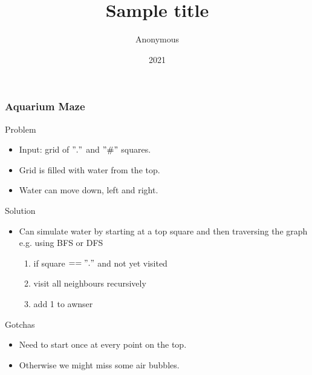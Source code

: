 \documentclass{beamer}
\title{Sample title}
\author{Anonymous}
\institute{Overleaf}
\date{2021}
\begin{document}
\frame{\titlepage}

\begin{frame}
    \frametitle{Aquarium Maze}
    \begin{block}{Problem}
        \begin{itemize}
            \item Input: grid of $"."$ and $"\#"$ squares.
            \item Grid is filled with water from the top.
            \item Water can move down, left and right.
        \end{itemize}
    \end{block}
    \begin{block}{Solution}
        \begin{itemize}
            \item Can simulate water by starting at a top square and then traversing the graph e.g. using BFS or DFS
            \begin{enumerate}
                \item if square $== "."$ and not yet visited
                \item visit all neighbours recursively
                \item add 1 to awnser
            \end{enumerate}
        \end{itemize}
    \end{block}
    \begin{block}{Gotchas}
        \begin{itemize}
            \item Need to start once at every point on the top.
            \item Otherwise we might miss some air bubbles.
        \end{itemize}
    \end{block}
\end{frame}
\end{document}
